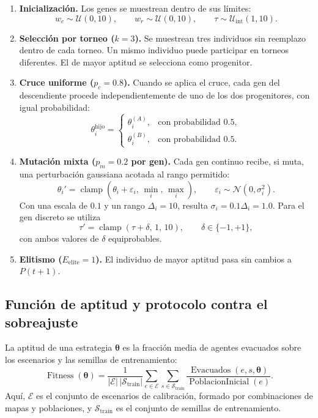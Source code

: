 \documentclass[11pt,letterpaper]{article}
\begin{document}
\begin{enumerate}
    \item \textbf{Inicialización.} Los genes se muestrean dentro de sus límites:
    \[
        w_c\sim\mathcal{U}(0,10),\qquad
        w_r\sim\mathcal{U}(0,10),\qquad
        \tau\sim\mathcal{U}_{\mathrm{int}}(1,10).
    \]

    \item \textbf{Selección por torneo ($k=3$).} Se muestrean tres individuos sin reemplazo dentro de cada torneo. Un mismo individuo puede participar en torneos diferentes. El de mayor aptitud se selecciona como progenitor.

    \item \textbf{Cruce uniforme ($p_c=0.8$).} Cuando se aplica el cruce, cada gen del descendiente procede independientemente de uno de los dos progenitores, con igual probabilidad:
    \[
        \theta_i^{\mathrm{hijo}}=
        \begin{cases}
            \theta_i^{(A)}, & \text{con probabilidad }0.5,\\
            \theta_i^{(B)}, & \text{con probabilidad }0.5.
        \end{cases}
    \]

    \item \textbf{Mutación mixta ($p_m=0.2$ por gen).} Cada gen continuo recibe, si muta, una perturbación gaussiana acotada al rango permitido:
    \[
        \theta_i'
        =
        \operatorname{clamp}
        \left(
            \theta_i+\varepsilon_i,\,
            \min_i,\,
            \max_i
        \right),
        \qquad
        \varepsilon_i\sim\mathcal{N}(0,\sigma_i^2).
    \]
    Con una escala de $0.1$ y un rango $\Delta_i=10$, resulta
    $\sigma_i=0.1\Delta_i=1.0$. Para el gen discreto se utiliza
    \[
        \tau'
        =
        \operatorname{clamp}(\tau+\delta,\,1,\,10),
        \qquad
        \delta\in\{-1,+1\},
    \]
    con ambos valores de $\delta$ equiprobables.

    \item \textbf{Elitismo ($E_{\mathrm{elite}}=1$).} El individuo de mayor aptitud pasa sin cambios a $P(t+1)$.
\end{enumerate}

\subsection{Función de aptitud y protocolo contra el sobreajuste}

La aptitud de una estrategia $\boldsymbol{\theta}$ es la fracción media de agentes evacuados sobre los escenarios y las semillas de entrenamiento:
\[
\operatorname{Fitness}(\boldsymbol{\theta})
=
\frac{1}
{|\mathcal{E}|\,|\mathcal{S}_{\mathrm{train}}|}
\sum_{e\in\mathcal{E}}
\sum_{s\in\mathcal{S}_{\mathrm{train}}}
\frac{
    \operatorname{Evacuados}(e,s,\boldsymbol{\theta})
}{
    \operatorname{PoblacionInicial}(e)
}.
\]
Aquí, $\mathcal{E}$ es el conjunto de escenarios de calibración, formado por combinaciones de mapas y poblaciones, y $\mathcal{S}_{\mathrm{train}}$ es el conjunto de semillas de entrenamiento.
\end{document}
